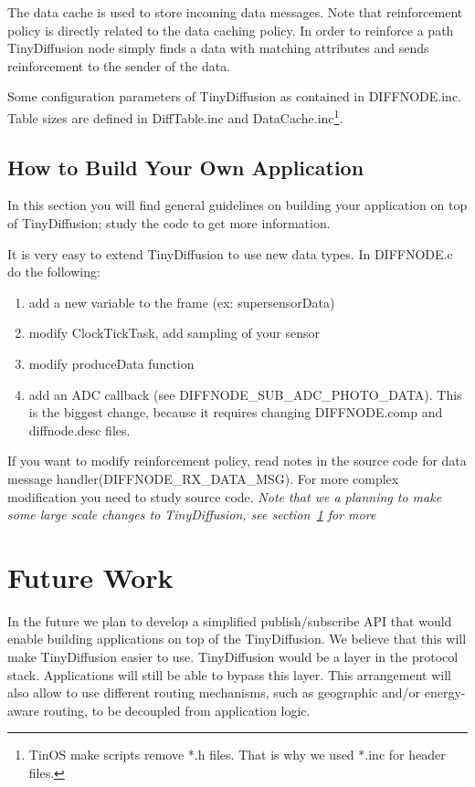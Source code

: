 \documentclass[11pt,onecolumn]{article}
\begin{document}
The data cache is used to store incoming data messages. Note that
reinforcement policy is directly related to the data caching
policy. In order to reinforce a path TinyDiffusion node simply finds a
data with matching attributes and sends reinforcement to the
sender of the data.

Some configuration parameters of TinyDiffusion as contained in
DIFFNODE.inc. Table sizes are defined in DiffTable.inc and
DataCache.inc\footnote{TinOS make scripts remove  *.h files. That is
why we used *.inc for header files.}.

\subsection{How to Build Your Own Application}
In this section you will find general guidelines on building your
application on top of TinyDiffusion; study the code to get more
information.

It is very easy to extend TinyDiffusion to use new data types. In
DIFFNODE.c do the following:
\begin{enumerate}
	\item add a new variable to the frame (ex: supersensorData)
	\item modify ClockTickTask, add sampling of your sensor
	\item modify produceData function
	\item add an ADC callback (see DIFFNODE\_SUB\_ADC\_PHOTO\_DATA). This
		  is the biggest change, because it requires changing
		  DIFFNODE.comp and diffnode.desc files.
\end{enumerate}

If you want to modify reinforcement policy, read notes in the source
code for data message handler(DIFFNODE\_RX\_DATA\_MSG). For more complex
modification you need to study source code. \emph{Note that
we a planning to make some large scale changes to TinyDiffusion, see
section~\ref{futurework} for more}

\section{Future Work}
\label{futurework}
In the future we plan to develop a simplified publish/subscribe API
that would enable building applications on top of the TinyDiffusion. We
believe that this will make TinyDiffusion easier to use. TinyDiffusion
would be a layer in the protocol stack. Applications will still be
able to bypass this layer. This arrangement will also allow to use
different routing mechanisms, such as geographic and/or energy-aware
routing, to be decoupled from application logic.
\end{document}
